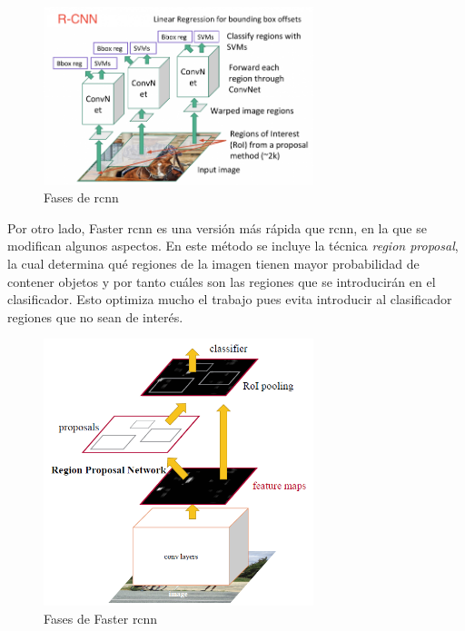 \begin{figure}[H]
  \begin{center}
    \includegraphics[width=0.7\textwidth]{figures/Estado_arte/rcnn.png}
		\caption{Fases de \acrshort{rcnn}}
		\label{fig.rcnn}
		\end{center}
\end{figure}

Por otro lado, Faster \acrshort{rcnn} es una versión más rápida que \acrshort{rcnn}, en la que se modifican algunos aspectos. En este método se incluye la técnica \textit{region proposal}, la cual determina qué regiones de la imagen tienen mayor probabilidad de contener objetos y por tanto cuáles son las regiones que se introducirán en el clasificador. Esto optimiza mucho el trabajo pues evita introducir al clasificador regiones que no sean de interés.

\begin{figure}
  \begin{center}
    \includegraphics[width=0.7\textwidth]{figures/Estado_arte/faster_rcnn.png}
		\caption{Fases de Faster \acrshort{rcnn}}
		\label{fig.fast_rcnn}
		\end{center}
\end{figure}

